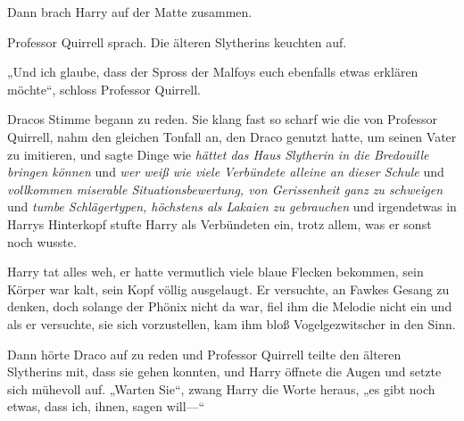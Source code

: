 Dann brach Harry auf der Matte zusammen.

Professor Quirrell sprach. Die älteren Slytherins keuchten auf.

„Und ich glaube, dass der Spross der Malfoys euch ebenfalls etwas erklären möchte“, schloss Professor Quirrell.

Dracos Stimme begann zu reden. Sie klang fast so scharf wie die von Professor Quirrell, nahm den gleichen Tonfall an, den Draco genutzt hatte, um seinen Vater zu imitieren, und sagte Dinge wie \emph{hättet das Haus Slytherin in die Bredouille bringen können} und \emph{wer weiß wie viele Verbündete alleine an dieser Schule} und \emph{vollkommen miserable Situationsbewertung, von Gerissenheit ganz zu schweigen} und \emph{tumbe Schlägertypen, höchstens als Lakaien zu gebrauchen} und irgendetwas in Harrys Hinterkopf stufte Harry als Verbündeten ein, trotz allem, was er sonst noch wusste.

Harry tat alles weh, er hatte vermutlich viele blaue Flecken bekommen, sein Körper war kalt, sein Kopf völlig ausgelaugt. Er versuchte, an Fawkes Gesang zu denken, doch solange der Phönix nicht da war, fiel ihm die Melodie nicht ein und als er versuchte, sie sich vorzustellen, kam ihm bloß Vogelgezwitscher in den Sinn.

Dann hörte Draco auf zu reden und Professor Quirrell teilte den älteren Slytherins mit, dass sie gehen konnten, und Harry öffnete die Augen und setzte sich mühevoll auf. „Warten Sie“, zwang Harry die Worte heraus, „es gibt noch etwas, dass ich, ihnen, sagen will—“

